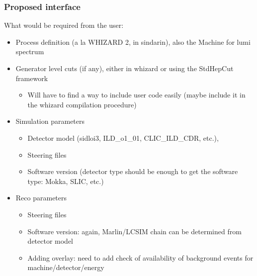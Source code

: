 \documentclass[10pt,table,dvipsnames]{beamer}
\begin{document}
\begin{frame}
  \frametitle{Proposed interface}
What would be required from the user:
\begin{itemize}
\item Process definition (a la WHIZARD 2, in sindarin), also the
  Machine for lumi spectrum
\item Generator level cuts (if any), either in whizard or using the
  StdHepCut framework
  \begin{itemize}
  \item Will have to find a way to include user code easily (maybe
    include it in the whizard compilation procedure)
  \end{itemize}
\item Simulation parameters
  \begin{itemize}
  \item Detector model (sidloi3, ILD\_o1\_01,
  CLIC\_ILD\_CDR, etc.), 
  \item Steering files 
  \item Software version (detector type should be enough to get the
    software type: Mokka, SLIC, etc.)
  \end{itemize}
\item Reco parameters
  \begin{itemize}
  \item Steering files
  \item Software version: again, Marlin/LCSIM chain can be determined
    from detector model
  \item Adding overlay: need to add check of availability of
    background events for machine/detector/energy
  \end{itemize}
\end{itemize}
\end{frame}
\end{document}
